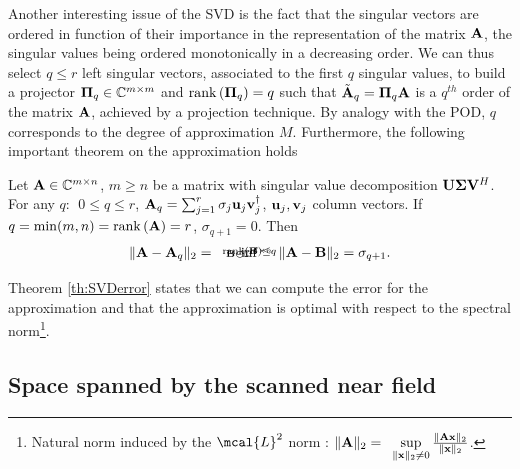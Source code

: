 \par Another interesting issue of the SVD is the fact that the singular vectors are ordered in function of their importance in the representation of the matrix $\mathbf{A}$, the singular values being ordered monotonically in a decreasing order. We can thus select $q \leq r$ left singular vectors, associated to the first $q$ singular values, to build a projector $\mathbf{\Pi}_q \in \mathbb{C}^{m \times m}$ and $\mathrm{rank} \left ( \mathbf{\Pi}_q \right ) = q$ such that $\tilde{\mathbf{A}}_q = \mathbf{\Pi}_q \mathbf{A}$ is a $q^{th}$ order  of the matrix $\mathbf{A}$, achieved by a projection technique. By analogy with the POD, $q$ corresponds to the degree of approximation $M$. Furthermore, the following important theorem on the approximation holds \cite{TrefethenBauNLA}
\begin{mythm} \label{th:SVDerror}
Let $\mathbf{A} \in \mathbb{C}^{m \times n}$, $m \geq n$ be a matrix with singular value decomposition $\mathbf{U} \mathbf{\Sigma} \mathbf{V}^H$.
For any $q : \ \ 0 \leq q \leq r $, $\mat{A}_q = \sum_{j=1}^{r} \sigma_j \vect{U}_j \vect{V}_j^{\dagger}$, $\vect{U}_j, \vect{V}_j$ column vectors. If $q = \mathrm{min}(m,n) = \mathrm{rank} \left ( \mathbf{A} \right ) = r$, $\sigma_{q+1} = 0$. Then
\begin{eqnarray*}
\| \mathbf{A} - \mathbf{A}_q \|_2 = \begin{array}[t]{c} \mathrm{inf} \\[-12pt] \scriptstyle {\mathbf{B} \in \mathbb{C}^{m \times n}} \\[-14pt] \scriptstyle { \mathrm{rank} \left ( \mathbf{B} \right ) } \leq q \end{array} \!\! \| \mathbf{A} - \mathbf{B} \|_2 = \sigma_{q+1}.
\end{eqnarray*}
\end{mythm}

\par Theorem \ref{th:SVDerror} states that we can compute the error for the approximation and that the approximation is optimal with respect to the spectral norm\footnote{ Natural norm induced by the $\mcal{L}^2$ norm : $ \| \mat{A} \|_2 = \begin{array}[t]{c} \mrm{sup} \\[-4pt] \scriptstyle {\|\vect{x}\|_2 \neq 0} \end{array} \! \! \frac{\|\mat{A}\vect{x}\|_2}{\|\vect{x}\|_2}$.}.

\subsection{Space spanned by the scanned near field} \label{sec:approxNF}

